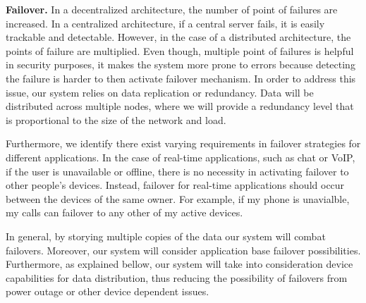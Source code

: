 \textbf{Failover.}  %
In a decentralized architecture, the number of point of failures are increased. 
In a centralized architecture, if a central server fails, it is easily trackable and detectable.
However, in the case of a distributed architecture, the points of failure are multiplied. 
Even though, multiple point of failures is helpful in security purposes, it makes the system more prone to errors because detecting the failure is harder to then activate failover mechanism.
In order to address this issue, our system relies on data replication or redundancy. 
Data will be distributed across multiple nodes, where we will provide a redundancy level that is proportional to the size of the network and load.

Furthermore, we identify there exist varying requirements in failover strategies for different applications. 
In the case of real-time applications, such as chat or VoIP, if the user is unavailable or offline, there is no necessity in activating failover to other people's devices. 
Instead, failover for real-time applications should occur between the devices of the same owner. 
For example, if my phone is unavialble, my calls can failover to any other of my active devices.

In general, by storying multiple copies of the data our system will combat failovers. 
Moreover, our system will consider application base failover possibilities. 
Furthermore, as explained bellow, our system will take into consideration device capabilities for data distribution, thus reducing the possibility of failovers from power outage or other device dependent issues.


